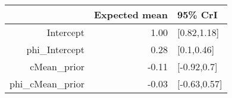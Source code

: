 \begin{tabular}{rrl}
  \hline
 & Expected mean & 95\% CrI \\ 
  \hline
Intercept & 1.00 & [0.82,1.18] \\ 
  phi\_Intercept & 0.28 & [0.1,0.46] \\ 
  cMean\_prior & -0.11 & [-0.92,0.7] \\ 
  phi\_cMean\_prior & -0.03 & [-0.63,0.57] \\ 
   \hline
\end{tabular}

